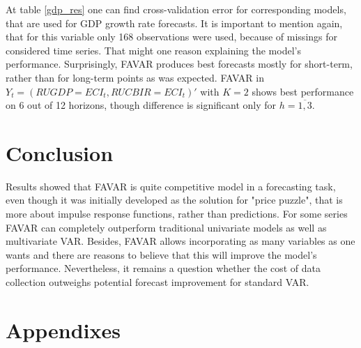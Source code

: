 \documentclass[a4paper, 14pt]{article}
\begin{document}
At table \ref{gdp_res} one can find cross-validation error for corresponding models, that are used for GDP growth rate forecasts. It is important to mention again, that for this variable only 168 observations were used, because of missings for considered time series. That might one reason explaining the model's performance. Surprisingly, FAVAR produces best forecasts mostly for short-term, rather than for long-term points as was expected. FAVAR in $Y_t=(RUGDP=ECI_t, RUCBIR=ECI_t)'$ with $K=2$ shows best performance on 6 out of 12 horizons, though difference is significant only for $h=\overline{1,3}$.

\section{Conclusion}
Results showed that FAVAR is quite competitive model in a forecasting task, even though it was initially developed as the solution for "price puzzle", that is more about impulse response functions, rather than predictions. For some series FAVAR can completely outperform traditional univariate models as well as multivariate VAR. Besides, FAVAR allows incorporating as many variables as one wants and there are reasons to believe that this will improve the model's performance. Nevertheless, it remains a question whether the cost of data collection outweighs potential forecast improvement for standard VAR. 



\newpage
\section*{Appendixes}
\appendix
\end{document}
